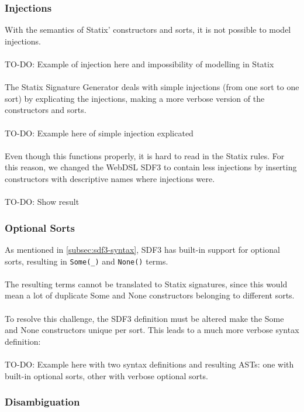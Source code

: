       \subsubsection{Injections}

        With the semantics of Statix' constructors and sorts, it is not possible to model injections.
        \\\\TO-DO: Example of injection here and impossibility of modelling in Statix
        \\\\The Statix Signature Generator deals with simple injections (from one sort to one sort) by explicating the injections, making a more verbose version of the constructors and sorts.
        \\\\TO-DO: Example here of simple injection explicated
        \\\\Even though this functions properly, it is hard to read in the Statix rules. For this reason, we changed the WebDSL SDF3 to contain less injections by inserting constructors with descriptive names where injections were.
        \\\\TO-DO: Show result

      \subsubsection{Optional Sorts}

        As mentioned in \cref{subsec:sdf3-syntax}, SDF3 has built-in support for optional sorts, resulting in \texttt{Some(\_)} and \texttt{None()} terms.
        \\\\The resulting terms cannot be translated to Statix signatures, since this would mean a lot of duplicate Some and None constructors belonging to different sorts.
        \\\\To resolve this challenge, the SDF3 definition must be altered make the Some and None constructors unique per sort. This leads to a much more verbose syntax definition:
        \\\\TO-DO: Example here with two syntax definitions and resulting ASTs: one with built-in optional sorts, other with verbose optional sorts.

      \subsubsection{Disambiguation}

